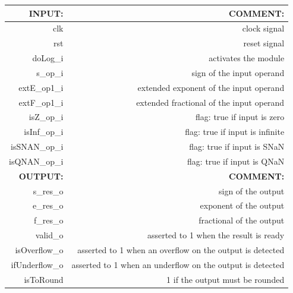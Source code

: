 \documentclass{report}
\begin{document}
\begin{table}[htbp]
\begin{tabular}{|r|r|} 
\hline
\textbf{INPUT:}  & \textbf{COMMENT:}                          \\ 
\hline
clk              & clock signal                              \\ 
\hline
rst              & reset signal                              \\ 
\hline
doLog\_i         & activates the module                      \\ 
\hline
s\_op\_i         & sign of the input operand                 \\ 
\hline
extE\_op1\_i     & extended exponent of the input operand    \\ 
\hline
extF\_op1\_i     & extended fractional of the input operand  \\ 
\hline
isZ\_op\_i       & flag: true if input is zero               \\ 
\hline
isInf\_op\_i     & flag: true if input is infinite           \\ 
\hline
isSNAN\_op\_i    & flag: true if input is SNaN               \\ 
\hline
isQNAN\_op\_i    & flag: true if input is QNaN               \\ 
\hline
\hline
\textbf{OUTPUT:} &    \textbf{COMMENT:}                                       \\ 
\hline
s\_res\_o        & sign of the output                        \\ 
\hline
e\_res\_o        & exponent of the output                    \\ 
\hline
f\_res\_o        & fractional of the output                  \\ 
\hline
valid\_o         & asserted to 1 when the result is ready    \\ 
\hline
isOverflow\_o    & asserted to 1 when an overflow on the output is detected                   \\ 
\hline
ifUnderflow\_o   & asserted to 1 when an underflow on the output is detected                                                     \\ 
\hline
isToRound        & 1 if the output must be rounded           \\
\hline
\end{tabular}
\end{table}
\end{document}
